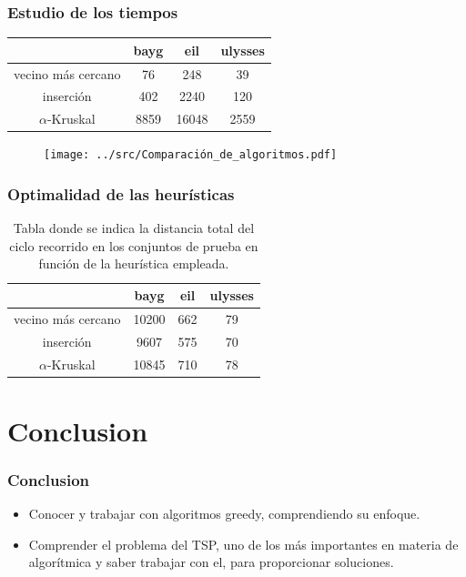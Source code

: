 \documentclass[13pt]{beamer}
\begin{document}
	\begin{frame}
		\frametitle{Estudio de los tiempos}

		
		\begin{table}[H]
			\centering
			\begin{tabular}{|c|c|c|c|}
			  \hline
			  & bayg & eil & ulysses \\
			  \hline
			  vecino más cercano & 76 & 248 & 39 \\
			  \hline
			  inserción & 402 & 2240 & 120 \\
			  \hline
			  $\alpha$-Kruskal & 8859 & 16048 & 2559 \\
			  \hline
			\end{tabular}
		\end{table}

		\begin{figure}[H]
			\centering
			\texttt{[image: ../src/Comparación\_de\_algoritmos.pdf]}
		\end{figure}

	\end{frame}

	\begin{frame}
		\frametitle{Optimalidad de las heurísticas}
		
		\begin{table}[H]
			\centering
			\begin{tabular}{|c|c|c|c|}
			\hline
			& bayg & eil & ulysses \\
			\hline
			vecino más cercano & 10200 & 662 & 79 \\
			\hline
			inserción & 9607 & 575 & 70 \\
			\hline
			$\alpha$-Kruskal & 10845 & 710 & 78 \\
			\hline
			\end{tabular}
			\caption{Tabla donde se indica la distancia total del ciclo recorrido en los conjuntos de prueba
			en función de la heurística empleada.}
		\end{table}	
	\end{frame}

	\section{Conclusion}

    \begin{frame}
		\frametitle{Conclusion}
		\begin{itemize}
			\item Conocer y trabajar con algoritmos greedy, comprendiendo su enfoque.
			\item Comprender el problema del TSP, uno de los más importantes en materia de algorítmica y saber trabajar con el, para proporcionar soluciones.
		\end{itemize}	
	\end{frame}
\end{document}
